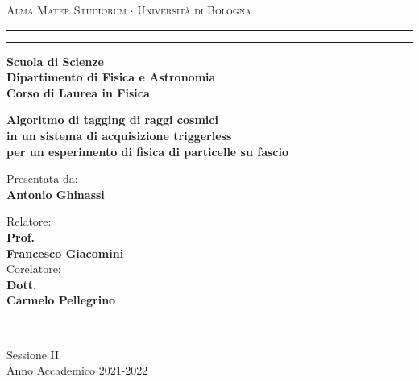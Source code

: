 \documentclass[../main.tex]{subfiles}
\begin{document}
\begin{titlepage}
    \begin{center}
        {{\Large{\textsc{Alma Mater Studiorum $\cdot$ Università di
                            Bologna}}}} \rule[0.1cm]{15.8cm}{0.1mm}
        \rule[0.5cm]{15.8cm}{0.6mm}
        {\small{\bf         Scuola di Scienze \\
                Dipartimento di Fisica e Astronomia\\
                Corso di Laurea in Fisica }}
    \end{center}
    \vspace{15mm}
    \begin{center}
        \vspace{3cm}
        \Large
        {\textbf{Algoritmo di tagging di raggi cosmici \\ in un sistema di acquisizione triggerless \\ per un esperimento di fisica di particelle su fascio}}
        \vspace{1cm}
    \end{center}
    \vspace{20mm}
    \par
    \noindent

    \vspace{8mm}
    \begin{minipage}[t]{0.34\textwidth}
        \begin{flushleft}
            {Presentata da: \\ \textbf{Antonio Ghinassi}}
        \end{flushleft}
    \end{minipage}
    \begin{minipage}[t]{0.64\textwidth}
        \begin{flushright}
            Relatore: \\
            \textbf{Prof.} \\
            \textbf{Francesco Giacomini} \\
            \vspace{0.5 cm}
            Corelatore: \\
            \textbf{Dott.}
            \\ \textbf{Carmelo Pellegrino}
        \end{flushright}
    \end{minipage}\\

    \vspace*{\fill}
    \begin{center}
        {\large{ Sessione II\\
                Anno Accademico 2021-2022}}
    \end{center}
\end{titlepage}
\end{document}
